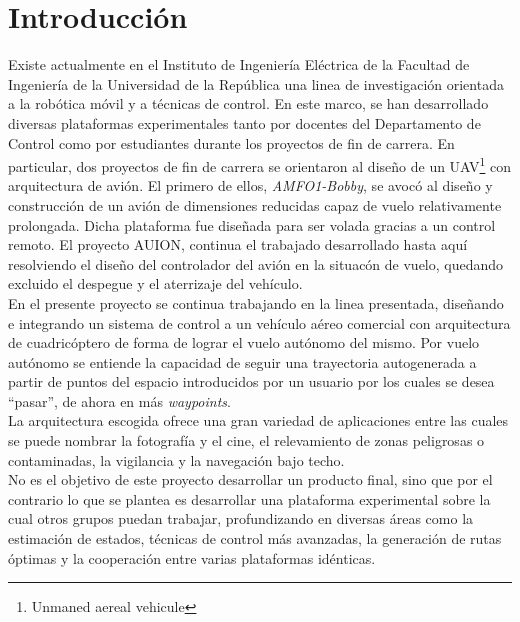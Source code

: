 \documentclass[main]{subfiles}
\begin{document}
\chapter*{Introducci\'on}

Existe actualmente en el Instituto de Ingenier\'ia El\'ectrica de la Facultad de Ingenier\'ia de la Universidad de la Rep\'ublica una linea de investigaci\'on orientada a la rob\'otica m\'ovil y a t\'ecnicas de control. En este marco, se han desarrollado diversas plataformas experimentales tanto por docentes del Departamento de Control como por estudiantes durante los proyectos de fin de carrera. En particular, dos proyectos de fin de carrera se orientaron al diseño de un UAV\footnote{Unmaned aereal vehicule} con arquitectura de avi\'on. El primero de ellos, \emph{AMFO1-Bobby}, se avoc\'o al diseño y construcci\'on de un avi\'on de dimensiones reducidas capaz de vuelo relativamente prolongada. Dicha plataforma fue diseñada para ser volada gracias a un control remoto. El proyecto AUION, continua el trabajado desarrollado hasta aqu\'i resolviendo el diseño del controlador del avi\'on  en la situac\'on de vuelo, quedando excluido el despegue y el aterrizaje del veh\'iculo.\\

En el presente proyecto se continua trabajando en la linea presentada, dise\~nando e integrando un sistema de control a un veh\'iculo a\'ereo comercial con arquitectura de cuadric\'optero de forma de lograr el vuelo aut\'onomo del mismo. Por vuelo aut\'onomo se entiende la capacidad de seguir una trayectoria autogenerada a partir de puntos del espacio introducidos por un usuario por los cuales se desea ``pasar'', de ahora en m\'as \emph{waypoints}. \\

La arquitectura escogida ofrece una gran variedad de aplicaciones entre las cuales se puede nombrar la fotograf\'ia y el cine, el relevamiento de zonas peligrosas o contaminadas, la  vigilancia y la navegaci\'on bajo techo. \\

No es el objetivo de este proyecto desarrollar un producto final, sino que por el contrario lo que se plantea es desarrollar una plataforma experimental sobre la cual otros grupos puedan trabajar, profundizando en diversas \'areas como la estimaci\'on de estados, t\'ecnicas de control m\'as avanzadas, la generaci\'on de rutas \'optimas y la cooperaci\'on entre varias plataformas id\'enticas.\\
\end{document}
